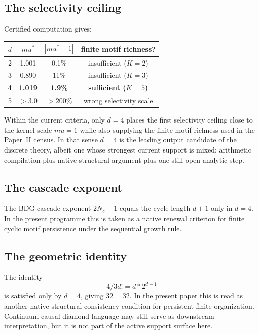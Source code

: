 \documentclass[11pt]{article}
\def\mu{mu}%
\def\frac#1#2{#1/#2}%
\def\cdot{*}%
\begin{document}
\subsection{The selectivity ceiling}

Certified computation gives:
\begin{center}
\begin{tabular}{rccc}
\toprule
$d$ & $\mu^*$ & $|\mu^*-1|$ & finite motif richness? \\
\midrule
2 & 1.001 & 0.1\% & insufficient ($K=2$) \\
3 & 0.890 & 11\% & insufficient ($K=3$) \\
\textbf{4} & \textbf{1.019} & \textbf{1.9\%} & \textbf{sufficient ($K=5$)} \\
5 & $>3.0$ & $>200\%$ & wrong selectivity scale \\
\bottomrule
\end{tabular}
\end{center}

Within the current criteria, only $d=4$ places the first selectivity ceiling close to the kernel scale $\mu=1$ while also supplying the finite motif richness used in the Paper~II census. In that sense $d=4$ is the leading output candidate of the discrete theory, albeit one whose strongest current support is mixed: arithmetic compilation plus native structural argument plus one still-open analytic step.

\subsection{The cascade exponent}

The BDG cascade exponent $2N_c-1$ equals the cycle length $d+1$ only in $d=4$. In the present programme this is taken as a native renewal criterion for finite cyclic motif persistence under the sequential growth rule.

\subsection{The geometric identity}

The identity
\[
\frac{4}{3}d! = d\cdot 2^{d-1}
\]
is satisfied only by $d=4$, giving $32=32$. In the present paper this is read as another native structural consistency condition for persistent finite organization. Continuum causal-diamond language may still serve as downstream interpretation, but it is not part of the active support surface here.
\end{document}
